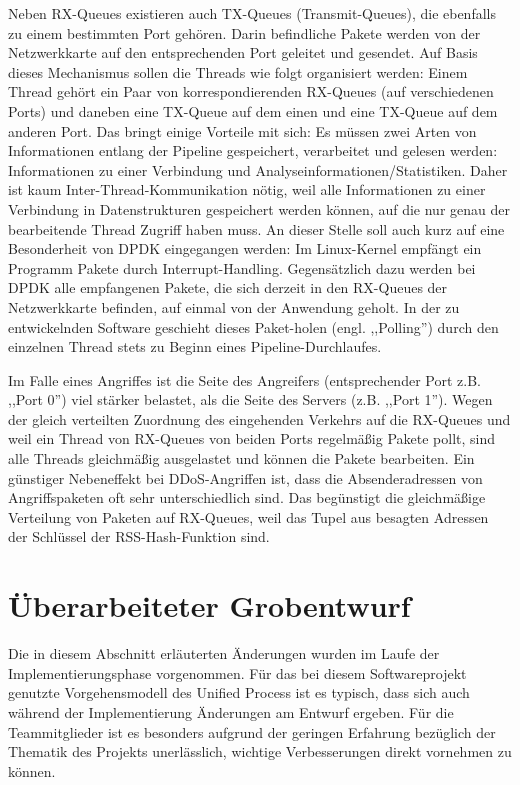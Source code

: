 \documentclass[../review_3.tex]{subfiles}
\begin{document}
Neben RX-Queues existieren auch TX-Queues (Transmit-Queues), die ebenfalls zu einem bestimmten Port gehören. Darin befindliche Pakete werden von der Netzwerkkarte auf den entsprechenden Port geleitet und gesendet. Auf Basis dieses Mechanismus sollen die Threads wie folgt organisiert werden: Einem Thread gehört ein Paar von korrespondierenden RX-Queues (auf verschiedenen Ports) und daneben eine TX-Queue auf dem einen und eine TX-Queue auf dem anderen Port. Das bringt einige Vorteile mit sich: Es müssen zwei Arten von Informationen entlang der Pipeline gespeichert, verarbeitet und gelesen werden: Informationen zu einer Verbindung und Analyseinformationen/Statistiken. Daher ist kaum Inter-Thread-Kommunikation nötig, weil alle Informationen zu einer Verbindung in Datenstrukturen gespeichert werden können, auf die nur genau der bearbeitende Thread Zugriff haben muss. An dieser Stelle soll auch kurz auf eine Besonderheit von DPDK eingegangen werden: Im Linux-Kernel empfängt ein Programm Pakete durch Interrupt-Handling. Gegensätzlich dazu werden bei DPDK alle empfangenen Pakete, die sich derzeit in den RX-Queues der Netzwerkkarte befinden, auf einmal von der Anwendung geholt. In der zu entwickelnden Software geschieht dieses Paket-holen (engl. ,,Polling'') durch den einzelnen Thread stets zu Beginn eines Pipeline-Durchlaufes.

Im Falle eines Angriffes ist die Seite des Angreifers (entsprechender Port z.B. ,,Port 0'') viel stärker belastet, als die Seite des Servers (z.B. ,,Port 1''). Wegen der gleich verteilten Zuordnung des eingehenden Verkehrs auf die RX-Queues und weil ein Thread von RX-Queues von beiden Ports regelmäßig Pakete pollt, sind alle Threads gleichmäßig ausgelastet und können die Pakete bearbeiten. Ein günstiger Nebeneffekt bei DDoS-Angriffen ist, dass die Absenderadressen von Angriffspaketen oft sehr unterschiedlich sind. Das begünstigt die gleichmäßige Verteilung von Paketen auf RX-Queues, weil das Tupel aus besagten Adressen der Schlüssel der RSS-Hash-Funktion sind.

\section{Überarbeiteter Grobentwurf}
Die in diesem Abschnitt erläuterten Änderungen wurden im Laufe der Implementierungsphase vorgenommen. Für das bei diesem Softwareprojekt genutzte Vorgehensmodell des Unified Process ist es typisch, dass sich auch während der Implementierung Änderungen am Entwurf ergeben. Für die Teammitglieder ist es besonders aufgrund der geringen Erfahrung bezüglich der Thematik des Projekts unerlässlich, wichtige Verbesserungen direkt vornehmen zu können.
\end{document}
